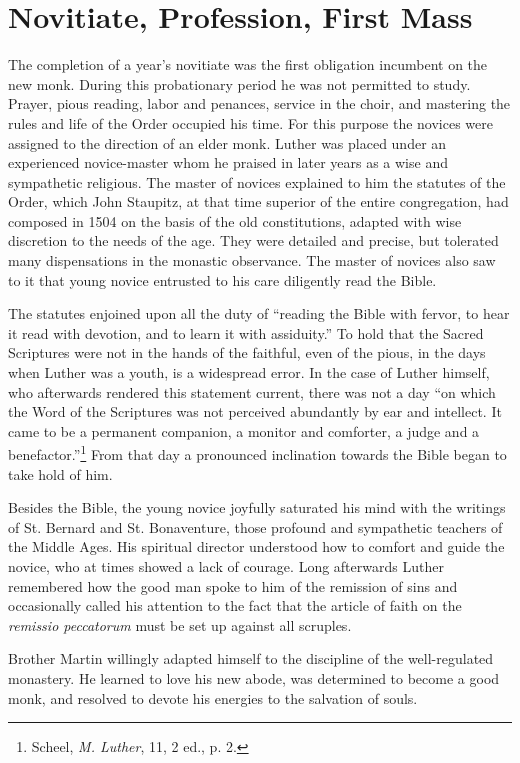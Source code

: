 \section{Novitiate, Profession, First Mass}
The completion of a year’s novitiate was the first obligation incumbent
on the new monk. During this probationary period he was
not permitted to study. Prayer, pious reading, labor and penances,
service in the choir, and mastering the rules and life of the Order
occupied his time. For this purpose the novices were assigned to the
direction of an elder monk. Luther was placed under an experienced
novice-master whom he praised in later years
as a wise and sympathetic religious. The master of novices explained
to him the statutes of the Order, which John Staupitz, at that time
superior of the entire congregation, had composed in 1504
on the basis of the old constitutions, adapted with wise discretion to
the needs of the age. They were detailed and precise, but tolerated many
dispensations in the monastic observance. The master of novices also saw to it that
young novice entrusted to his care diligently read the Bible.

The statutes enjoined upon all the duty of
“reading the Bible with fervor, to hear it read with devotion, and to learn it with assiduity.”
To hold that the Sacred Scriptures were not in the hands of the faithful, even of the pious, in the days
when Luther was a youth, is a widespread error. In the case of Luther himself, who afterwards
rendered this statement current, there was not a day “on which the Word of the Scriptures was not
perceived abundantly by ear and intellect. It came to be a permanent companion,
a monitor and comforter, a judge and a benefactor.”\footnote{Scheel, \textit{M. Luther}, 11, 2 ed., p. 2.}
From that day a pronounced inclination towards the Bible began to take hold of him.

Besides the Bible, the young novice joyfully saturated his mind
with the writings of St. Bernard
and St. Bonaventure, those profound and sympathetic teachers of
the Middle Ages. His spiritual director understood how to comfort and guide the novice, who at
times showed a lack of courage. Long afterwards Luther remembered
how the good man spoke to him of the remission of sins and occasionally
called his attention to the fact that the article of faith on the
\textit{remissio peccatorum} must be set up against all scruples.

Brother Martin willingly adapted himself to the discipline of the
well-regulated monastery. He learned to love his new abode, was
determined to become a good monk, and resolved to devote his
energies to the salvation of souls.

